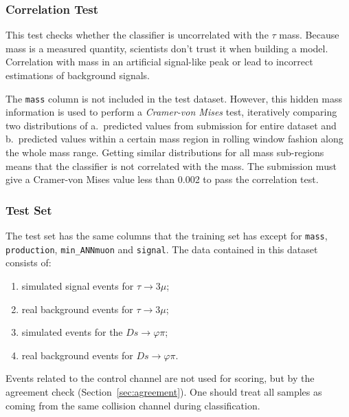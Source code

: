 \documentclass[conference]{IEEEtran}
\begin{document}
\subsubsection{Correlation Test}
\label{sec:correlation}
This test checks whether the classifier is uncorrelated with the $\tau$ mass.
Because mass is a measured quantity, scientists don't trust it when building a
model. Correlation with mass in an artificial signal-like peak or lead to
incorrect estimations of background signals.

The \texttt{mass} column is not included in the test dataset. However, this hidden
mass information is used to perform a \textit{Cramer-von Mises} test,
iteratively comparing two distributions of a.\ predicted values from submission
for entire dataset and b.\ predicted values within a certain mass region in
rolling window fashion along the whole mass range. Getting similar distributions
for all mass sub-regions means that the classifier is not correlated with the
mass. The submission must give a Cramer-von Mises value less than 0.002 to pass
the correlation test.

\subsubsection{Test Set}
\label{sec:test-set}
The test set has the same columns that the training set has except for
\texttt{mass}, \texttt{production}, \texttt{min\_ANNmuon} and \texttt{signal}.
The data contained in this dataset consists of:
\begin{enumerate}
	\item simulated signal events for $\tau \rightarrow 3\mu$;
	\item real background events for $\tau \rightarrow 3\mu$;
	\item simulated events for the $Ds \rightarrow \varphi\pi$;
	\item real background events for $Ds \rightarrow \varphi\pi$.
\end{enumerate}
Events related to the control channel are not used for scoring, but by the
agreement check (Section~\ref{sec:agreement}). One should treat all samples as
coming from the same collision channel during classification.

\end{document}
